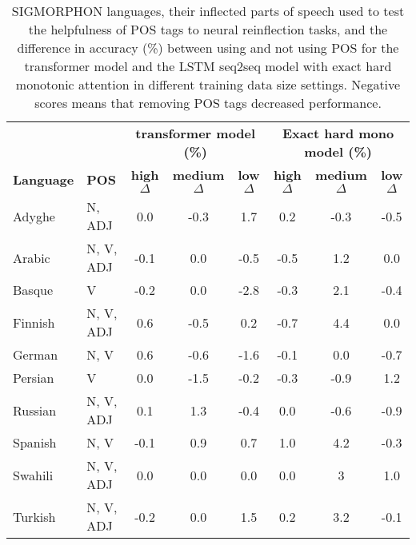 \begin{table}[h!]
    \centering
    \begin{tabular}{ll|ccc|ccc}
    \toprule
        & & \multicolumn{3}{c|}{\textbf{transformer model (\%)}} & \multicolumn{3}{|c}{\textbf{Exact hard mono model (\%)}} \\
        \cline{3-8}
       \textbf{Language} & \textbf{POS} & \textbf{high $\Delta$} & \textbf{medium $\Delta$} & \textbf{low $\Delta$} & \textbf{high $\Delta$} & \textbf{medium $\Delta$} & \textbf{low $\Delta$} \\
      Adyghe  & N, ADJ & 0.0 & -0.3 & 1.7 & 0.2 & -0.3 & -0.5 \\
      Arabic & N, V, ADJ & -0.1 & 0.0 & -0.5 & -0.5 & 1.2 & 0.0 \\
      Basque &  V & -0.2 & 0.0 & -2.8 & -0.3 & 2.1 & -0.4 \\
      Finnish & N, V, ADJ & 0.6 & -0.5 & 0.2 & -0.7 & 4.4 & 0.0 \\
      German & N, V & 0.6 & -0.6 & -1.6 & -0.1 & 0.0 & -0.7 \\
      Persian & V & 0.0 & -1.5 & -0.2 & -0.3 & -0.9 & 1.2 \\
      Russian & N, V, ADJ & 0.1 & 1.3 & -0.4 & 0.0 & -0.6 & -0.9 \\
      Spanish & N, V & -0.1 & 0.9 & 0.7 & 1.0 & 4.2 & -0.3 \\
      Swahili & N, V, ADJ & 0.0 & 0.0 & 0.0 & 0.0 & 3 & 1.0 \\
      Turkish & N, V, ADJ & -0.2 & 0.0 & 1.5 & 0.2 & 3.2 & -0.1 \\
    \end{tabular}
    \caption[SIGMORPHON languages Reinflection with/out POS tags]{SIGMORPHON languages, their inflected parts of speech used to test the helpfulness of POS tags to neural reinflection tasks, and the difference in accuracy (\%) between using and not using POS for the transformer model and the LSTM seq2seq model with exact hard monotonic attention in different training data size settings. Negative scores means that removing POS tags decreased performance.}
    \label{tab:POSIGT2P}
\end{table}


